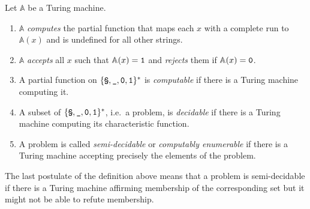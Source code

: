\begin{defin}
    Let $\mathbb A$ be a Turing machine.
    
    \begin{enumerate}
        \item
          $\mathbb A$ \emph{computes} the partial function that maps each
          $x$ with a complete run to $\mathbb A(x)$ and is undefined for all
          other strings.
        \item
          $\mathbb A$ \emph{accepts} all $x$ such that
          $\mathbb A(x) = \one$ and \emph{rejects} them if
          $\mathbb A(x) = \zer$.
        \item
          A partial function on $\lbrace \sta, \emp, \zer, \one \rbrace^*$ is
          \emph{computable} if there is a Turing machine computing it.
        \item
          A subset of $\lbrace \sta, \emp, \zer, \one \rbrace^*$, i.e.~a
          problem, is \emph{decidable} if there is a Turing machine computing
          its characteristic function.
        \item
          A problem is called \emph{semi-decidable} or \emph{computably
          enumerable} if there is a Turing machine accepting precisely the
          elements of the problem.
    \end{enumerate}
\end{defin}

The last postulate of the definition above means that a problem is
semi-decidable if there is a Turing machine affirming membership of the
corresponding set but it might not be able to refute membership.

